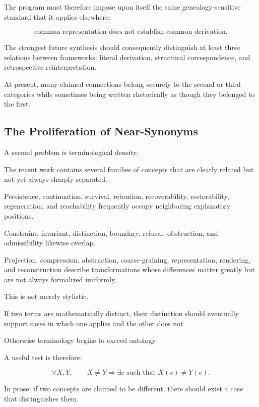 \documentclass[11pt]{article}
\theoremstyle{remark}
\begin{document}
The program must therefore impose upon itself the same genealogy-sensitive standard that it applies elsewhere:

\begin{equation}
\boxed{
\text{common representation does not establish common derivation}.
}
\end{equation}

The strongest future synthesis should consequently distinguish at least three relations between frameworks: literal derivation, structural correspondence, and retrospective reinterpretation.

At present, many claimed connections belong securely to the second or third categories while sometimes being written rhetorically as though they belonged to the first.

\subsection{The Proliferation of Near-Synonyms}

A second problem is terminological density.

The recent work contains several families of concepts that are clearly related but not yet always sharply separated.

Persistence, continuation, survival, retention, recoverability, restorability, regeneration, and reachability frequently occupy neighboring explanatory positions.

Constraint, invariant, distinction, boundary, refusal, obstruction, and admissibility likewise overlap.

Projection, compression, abstraction, coarse-graining, representation, rendering, and reconstruction describe transformations whose differences matter greatly but are not always formalized uniformly.

This is not merely stylistic.

If two terms are mathematically distinct, their distinction should eventually support cases in which one applies and the other does not.

Otherwise terminology begins to exceed ontology.

A useful test is therefore:

\begin{equation}
\forall X,Y,\qquad
X\neq Y
\Rightarrow
\exists c
\text{ such that }
X(c)\neq Y(c).
\end{equation}

In prose: if two concepts are claimed to be different, there should exist a case that distinguishes them.
\end{document}
